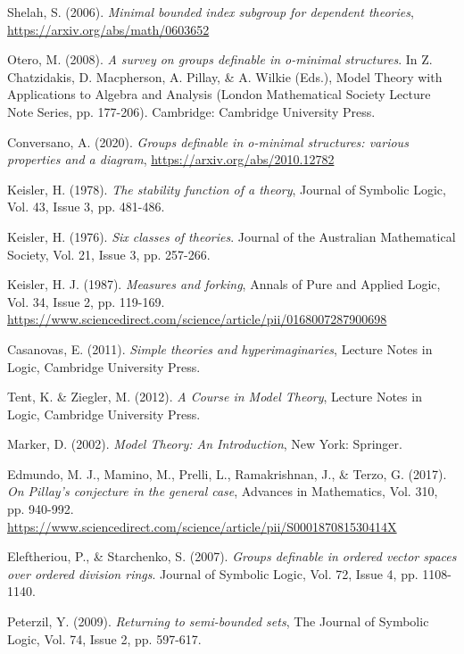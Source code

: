 \documentclass[a4paper]{report}
\theoremstyle{definition}
\theoremstyle{remstyle}
\begin{document}
\begin{thebibliography}{100}
	 Shelah, S. (2006). \emph{Minimal bounded index subgroup for dependent theories}, \url{https://arxiv.org/abs/math/0603652}

	 Otero, M. (2008). \emph{A survey on groups definable in o-minimal structures}. In Z. Chatzidakis, D. Macpherson, A. Pillay, \& A. Wilkie (Eds.), Model Theory with Applications to Algebra and Analysis (London Mathematical Society Lecture Note Series, pp. 177-206). Cambridge: Cambridge University Press.

	 Conversano, A. (2020). \emph{Groups definable in o-minimal structures: various properties and a diagram}, \url{https://arxiv.org/abs/2010.12782}

	 Keisler, H. (1978). \emph{The stability function of a theory}, Journal of Symbolic Logic, Vol. 43, Issue 3, pp. 481-486.

	 Keisler, H. (1976). \emph{Six classes of theories}. Journal of the Australian Mathematical Society, Vol. 21, Issue 3, pp. 257-266.

	 Keisler, H. J. (1987). \emph{Measures and forking}, Annals of Pure and Applied Logic, Vol. 34, Issue 2, pp. 119-169. \url{https://www.sciencedirect.com/science/article/pii/0168007287900698}

	 Casanovas, E. (2011). \emph{Simple theories and hyperimaginaries}, Lecture Notes in Logic, Cambridge University Press.

	 Tent, K. \& Ziegler, M. (2012). \emph{A Course in Model Theory}, Lecture Notes in Logic, Cambridge University Press.

	 Marker, D. (2002). \emph{Model Theory: An Introduction}, New York: Springer.

	 Edmundo, M. J., Mamino, M., Prelli, L., Ramakrishnan, J., \& Terzo, G. (2017). \emph{On Pillay's conjecture in the general case}, Advances in Mathematics, Vol. 310, pp. 940-992. \url{https://www.sciencedirect.com/science/article/pii/S000187081530414X}

	 Eleftheriou, P., \& Starchenko, S. (2007). \emph{Groups definable in ordered vector spaces over ordered division rings}. Journal of Symbolic Logic, Vol. 72, Issue 4, pp. 1108-1140.

	 Peterzil, Y. (2009). \emph{Returning to semi-bounded sets}, The Journal of Symbolic Logic, Vol. 74, Issue 2, pp. 597-617.


\end{thebibliography}
\end{document}
